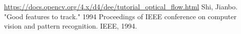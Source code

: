 \documentclass[czech,11pt,a4paper]{article}
\begin{document}
\begin{multicols}{2}
		

		\begin{thebibliography}{9}
		{\url{https://docs.opencv.org/4.x/d4/dee/tutorial_optical_flow.html}
		Shi, Jianbo. "Good features to track." 1994 Proceedings of IEEE conference on computer vision and pattern recognition. IEEE, 1994.
		
		
	
		}
		\end{thebibliography}
		
		
		
		
		
	\end{multicols}
\end{document}
